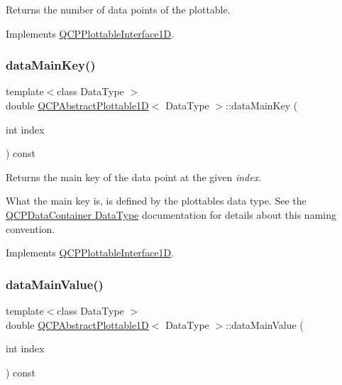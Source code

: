 Returns the number of data points of the plottable. 

Implements \hyperlink{classQCPPlottableInterface1D_a058a22c770ef4d5a0e878a7f02183da9}{Q\+C\+P\+Plottable\+Interface1D}.

\mbox{\label{classQCPAbstractPlottable1D_aeb156ebf5d3c8de906b428be30733ad8}} 
\subsubsection{\texorpdfstring{data\+Main\+Key()}{dataMainKey()}}
{\footnotesize\ttfamily template$<$class Data\+Type $>$ \\
double \hyperlink{classQCPAbstractPlottable1D}{Q\+C\+P\+Abstract\+Plottable1D}$<$ Data\+Type $>$\+::data\+Main\+Key (\begin{DoxyParamCaption}\item[{int}]{index }\end{DoxyParamCaption}) const\hspace{0.3cm}{\ttfamily [virtual]}}





Returns the main key of the data point at the given {\itshape index}.

What the main key is, is defined by the plottable\textquotesingle{}s data type. See the \hyperlink{classQCPDataContainer_qcpdatacontainer-datatype}{Q\+C\+P\+Data\+Container Data\+Type} documentation for details about this naming convention. 

Implements \hyperlink{classQCPPlottableInterface1D_a2bd60daaac046945fead558cbd83cf73}{Q\+C\+P\+Plottable\+Interface1D}.

\mbox{\label{classQCPAbstractPlottable1D_a6be0f657ba85a1688336d76ad649ecf2}} 
\subsubsection{\texorpdfstring{data\+Main\+Value()}{dataMainValue()}}
{\footnotesize\ttfamily template$<$class Data\+Type $>$ \\
double \hyperlink{classQCPAbstractPlottable1D}{Q\+C\+P\+Abstract\+Plottable1D}$<$ Data\+Type $>$\+::data\+Main\+Value (\begin{DoxyParamCaption}\item[{int}]{index }\end{DoxyParamCaption}) const\hspace{0.3cm}{\ttfamily [virtual]}}





